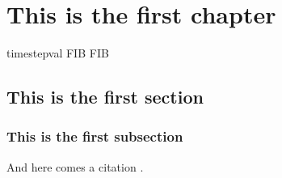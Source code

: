 \chapter{This is the first chapter}
\gls{timestepval}
\gls{FIB} \gls{FIB}
\lipsum
\section{This is the first section}
\lipsum
\subsection{This is the first subsection}
\lipsum
And here comes a citation \cite{lovecraft2016el}.
